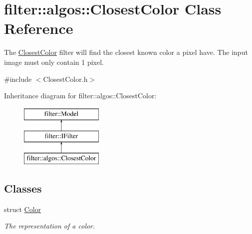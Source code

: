 \hypertarget{classfilter_1_1algos_1_1_closest_color}{}\section{filter\+:\+:algos\+:\+:Closest\+Color Class Reference}
\label{classfilter_1_1algos_1_1_closest_color}


The \hyperlink{classfilter_1_1algos_1_1_closest_color}{Closest\+Color} filter will find the closest known color a pixel have. The input image must only contain 1 pixel.  




{\ttfamily \#include $<$Closest\+Color.\+h$>$}

Inheritance diagram for filter\+:\+:algos\+:\+:Closest\+Color\+:\begin{figure}[H]
\begin{center}
\leavevmode
\includegraphics[height=3.000000cm]{d1/d1c/classfilter_1_1algos_1_1_closest_color}
\end{center}
\end{figure}
\subsection*{Classes}
\begin{DoxyCompactItemize}
\item 
struct \hyperlink{structfilter_1_1algos_1_1_closest_color_1_1_color}{Color}
\begin{DoxyCompactList}\small\item\em The representation of a color. \end{DoxyCompactList}\end{DoxyCompactItemize}
